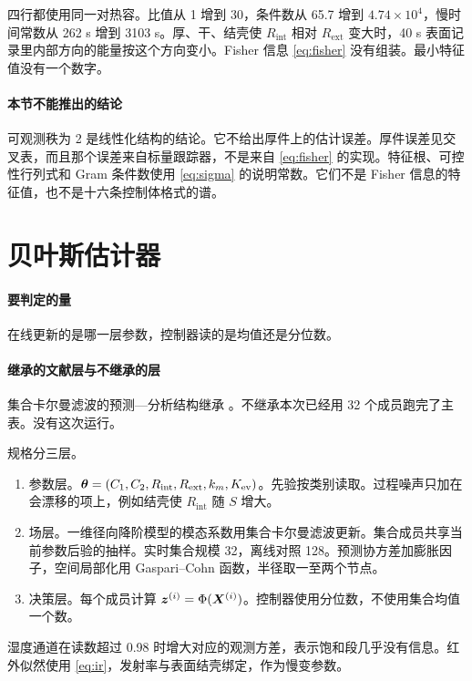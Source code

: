 四行都使用同一对热容。比值从 1 增到 30，条件数从 65.7 增到 \(4.74\times 10^{4}\)，慢时间常数从 262 s 增到 3103 s。厚、干、结壳使 \(R_{\mathrm{int}}\) 相对 \(R_{\mathrm{ext}}\) 变大时，40 s 表面记录里内部方向的能量按这个方向变小。Fisher 信息 \eqref{eq:fisher} 没有组装。最小特征值没有一个数字。

\paragraph{本节不能推出的结论}
可观测秩为 2 是线性化结构的结论。它不给出厚件上的估计误差。厚件误差见交叉表，而且那个误差来自标量跟踪器，不是来自 \eqref{eq:fisher} 的实现。特征根、可控性行列式和 Gram 条件数使用 \eqref{eq:sigma} 的说明常数。它们不是 Fisher 信息的特征值，也不是十六条控制体格式的谱。

\section{贝叶斯估计器}

\paragraph{要判定的量}
在线更新的是哪一层参数，控制器读的是均值还是分位数。

\paragraph{继承的文献层与不继承的层}
集合卡尔曼滤波的预测—分析结构继承 \cite{evensen2003}。不继承本次已经用 32 个成员跑完了主表。没有这次运行。

规格分三层。

\begin{enumerate}
\item 参数层。\(\bm{\theta}=(C_1,C_2,R_{\mathrm{int}},R_{\mathrm{ext}},k_m,K_{\mathrm{ev}})\)。先验按类别读取。过程噪声只加在会漂移的项上，例如结壳使 \(R_{\mathrm{int}}\) 随 \(S\) 增大。
\item 场层。一维径向降阶模型的模态系数用集合卡尔曼滤波更新。集合成员共享当前参数后验的抽样。实时集合规模 32，离线对照 128。预测协方差加膨胀因子，空间局部化用 Gaspari--Cohn 函数，半径取一至两个节点。
\item 决策层。每个成员计算 \(\bm{z}^{(i)}=\Phi(\bm{X}^{(i)})\)。控制器使用分位数，不使用集合均值一个数。
\end{enumerate}

湿度通道在读数超过 0.98 时增大对应的观测方差，表示饱和段几乎没有信息。红外似然使用 \eqref{eq:ir}，发射率与表面结壳绑定，作为慢变参数。

